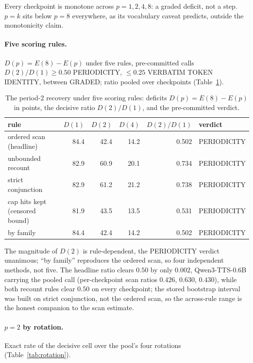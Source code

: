 \noindent Every checkpoint is monotone across $p=1,2,4,8$: a graded
deficit, not a step. $p{=}k$ sits below $p{=}8$ everywhere, as its
vocabulary caveat predicts, outside the monotonicity claim.

\paragraph{Five scoring rules.} $D(p)=E(8)-E(p)$ under five rules,
pre-committed calls $D(2)/D(1)\ge0.50$ PERIODICITY, $\le0.25$ VERBATIM
TOKEN IDENTITY, between GRADED; ratio pooled over checkpoints
(Table~\ref{tab:fiverules}).

\begin{table}[tp]\centering
\caption{The period-2 recovery under five scoring rules: deficits $D(p)=E(8)-E(p)$ in points, the decisive ratio $D(2)/D(1)$, and the pre-committed verdict.}
\label{tab:fiverules}
\begin{tabular}{@{}lrrrrl@{}}
\toprule
rule & $D(1)$ & $D(2)$ & $D(4)$ & $D(2)/D(1)$ & verdict \\
\midrule
ordered scan (headline)     & 84.4 & 42.4 & 14.2 & 0.502 & PERIODICITY \\
unbounded recount           & 82.9 & 60.9 & 20.1 & 0.734 & PERIODICITY \\
strict conjunction          & 82.9 & 61.2 & 21.2 & 0.738 & PERIODICITY \\
cap hits kept (censored bound) & 81.9 & 43.5 & 13.5 & 0.531 & PERIODICITY \\
by family                   & 84.4 & 42.4 & 14.2 & 0.502 & PERIODICITY \\
\bottomrule
\end{tabular}
\end{table}

\noindent The magnitude of $D(2)$ is rule-dependent, the PERIODICITY
verdict unanimous; ``by family'' reproduces the ordered scan, so four
independent methods, not five. The headline ratio clears $0.50$ by
only $0.002$, Qwen3-TTS-0.6B carrying the pooled call (per-checkpoint
scan ratios $0.426$, $0.630$, $0.430$), while both recount rules clear
$0.50$ on every checkpoint; the stored bootstrap interval was built on
strict conjunction, not the ordered scan, so the across-rule range is
the honest companion to the scan estimate.

\paragraph{$p{=}2$ by rotation.} Exact rate of the decisive cell over
the pool's four rotations (Table~\ref{tab:rotation}).

